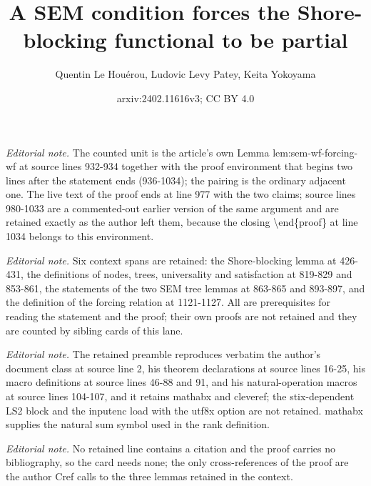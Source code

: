 \documentclass{article}
\title{A SEM condition forces the Shore-blocking functional to be partial}
\author{Quentin Le Houérou, Ludovic Levy Patey, Keita Yokoyama}
\date{arxiv:2402.11616v3; CC BY 4.0}
\numberwithin{theorem}{section}
\begin{document}
\maketitle
\noindent\textit{Editorial note.} The counted unit is the article's own Lemma lem:sem-wf-forcing-wf at source lines 932-934 together with the proof environment that begins two lines after the statement ends (936-1034); the pairing is the ordinary adjacent one. The live text of the proof ends at line 977 with the two claims; source lines 980-1033 are a commented-out earlier version of the same argument and are retained exactly as the author left them, because the closing \textbackslash{}end\{proof\} at line 1034 belongs to this environment.\par\medskip
\noindent\textit{Editorial note.} Six context spans are retained: the Shore-blocking lemma at 426-431, the definitions of nodes, trees, universality and satisfaction at 819-829 and 853-861, the statements of the two SEM tree lemmas at 863-865 and 893-897, and the definition of the forcing relation at 1121-1127. All are prerequisites for reading the statement and the proof; their own proofs are not retained and they are counted by sibling cards of this lane.\par\medskip
\noindent\textit{Editorial note.} The retained preamble reproduces verbatim the author's document class at source line 2, his theorem declarations at source lines 16-25, his macro definitions at source lines 46-88 and 91, and his natural-operation macros at source lines 104-107, and it retains mathabx and cleveref; the stix-dependent LS2 block and the inputenc load with the utf8x option are not retained. mathabx supplies the natural sum symbol used in the rank definition.\par\medskip
\noindent\textit{Editorial note.} No retained line contains a citation and the proof carries no bibliography, so the card needs none; the only cross-references of the proof are the author Cref calls to the three lemmas retained in the context.\par\medskip
\end{document}
